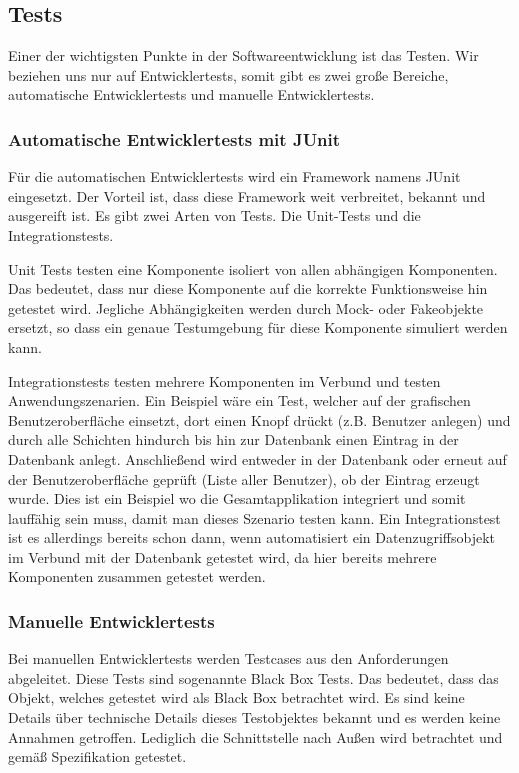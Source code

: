 
\subsection{Tests}

Einer der wichtigsten Punkte in der Softwareentwicklung ist das Testen. Wir beziehen uns nur auf Entwicklertests, somit gibt es zwei große Bereiche, automatische Entwicklertests und manuelle Entwicklertests. 

\subsubsection{Automatische Entwicklertests mit JUnit}

Für die automatischen Entwicklertests wird ein Framework namens JUnit eingesetzt. Der Vorteil ist, dass diese Framework weit verbreitet, bekannt und ausgereift ist. 
Es gibt zwei Arten von Tests. Die Unit-Tests und die Integrationstests. 

Unit Tests testen eine Komponente isoliert von allen abhängigen Komponenten. Das bedeutet, dass nur diese Komponente auf die korrekte Funktionsweise hin getestet wird. Jegliche Abhängigkeiten werden durch Mock- oder Fakeobjekte ersetzt, so dass ein genaue Testumgebung für diese Komponente simuliert werden kann. 

Integrationstests testen mehrere Komponenten im Verbund und testen Anwendungszenarien. Ein Beispiel wäre ein Test, welcher auf der grafischen Benutzeroberfläche einsetzt, dort einen Knopf drückt (z.B. Benutzer anlegen) und durch alle Schichten hindurch bis hin zur Datenbank einen Eintrag in der Datenbank anlegt. Anschließend wird entweder in der Datenbank oder erneut auf der Benutzeroberfläche geprüft (Liste aller Benutzer), ob der Eintrag erzeugt wurde. 
Dies ist ein Beispiel wo die Gesamtapplikation integriert und somit lauffähig sein muss, damit man dieses Szenario testen kann. 
Ein Integrationstest ist es allerdings bereits schon dann, wenn automatisiert ein Datenzugriffsobjekt im Verbund mit der Datenbank getestet wird, da hier bereits mehrere Komponenten zusammen getestet werden. 


\subsubsection{Manuelle Entwicklertests}

Bei manuellen Entwicklertests werden Testcases aus den Anforderungen abgeleitet. Diese Tests sind sogenannte Black Box Tests. Das bedeutet, dass das Objekt, welches getestet wird als Black Box betrachtet wird. Es sind keine Details über technische Details dieses Testobjektes bekannt und es werden keine Annahmen getroffen. Lediglich die Schnittstelle nach Außen wird betrachtet und gemäß Spezifikation getestet. 

